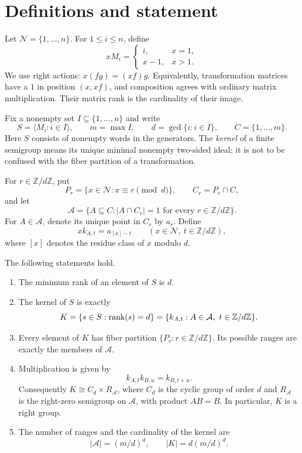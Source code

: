 \section{Definitions and statement}
\label{notation:ptc-definitions}

Let $\mathcal N=\{1,\ldots,n\}$. For $1\le i\le n$, define
\[
 xM_i=\begin{cases}i,&x=1,\\x-1,&x>1.\end{cases}
\]
We use right actions: $x(fg)=(xf)g$. Equivalently, transformation matrices
have a $1$ in position $(x,xf)$, and composition agrees with ordinary
matrix multiplication. Their matrix rank is the cardinality of their image.

Fix a nonempty set $I\subseteq\{1,\ldots,n\}$ and write
\[
 S=\langle M_i:i\in I\rangle,\qquad
 m=\max I,\qquad d=\gcd\{i:i\in I\},\qquad C=\{1,\ldots,m\}.
\]
Here $S$ consists of nonempty words in the generators. The \emph{kernel}
of a finite semigroup means its unique minimal nonempty two-sided ideal;
it is not to be confused with the fiber partition of a transformation.

For $r\in\mathbb{Z}/d\mathbb{Z}$, put
\[
 P_r=\{x\in\mathcal N:x\equiv r\pmod d\},\qquad C_r=P_r\cap C,
\]
and let
\[
 \mathcal A=\{A\subseteq C:|A\cap C_r|=1\text{ for every }r\in\mathbb{Z}/d\mathbb{Z}\}.
\]
For $A\in\mathcal A$, denote its unique point in $C_r$ by $a_r$. Define
\[
 xk_{A,t}=a_{[x]-t}\qquad(x\in\mathcal N,\ t\in\mathbb{Z}/d\mathbb{Z}),
\]
where $[x]$ denotes the residue class of $x$ modulo $d$.

\begin{theorem}\label{ptc-kernel:thm:main}

The following statements hold.
\begin{enumerate}
\item The minimum rank of an element of $S$ is $d$.
\item The kernel of $S$ is exactly
\[
 K=\{s\in S:\rank(s)=d\}
   =\{k_{A,t}:A\in\mathcal A,\ t\in\mathbb{Z}/d\mathbb{Z}\}.
\]
\item Every element of $K$ has fiber partition $\{P_r:r\in\mathbb{Z}/d\mathbb{Z}\}$.
Its possible ranges are exactly the members of $\mathcal A$.
\item Multiplication is given by
\[
 k_{A,t}k_{B,u}=k_{B,t+u}.
\]
Consequently $K\cong C_d\times R_{\mathcal A}$, where $C_d$ is the cyclic
group of order $d$ and $R_{\mathcal A}$ is the right-zero semigroup
on $\mathcal A$, with product $AB=B$. In particular, $K$ is a right group.
\item The number of ranges and the cardinality of the kernel are
\[
 |\mathcal A|=(m/d)^d,\qquad |K|=d(m/d)^d.
\]
\end{enumerate}
\end{theorem}
